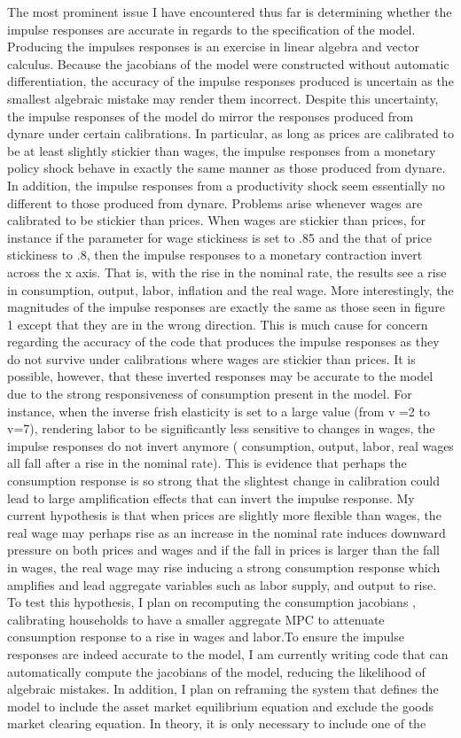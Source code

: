 \documentclass[titlepage]{\econtex}\providecommand{\texname}{FBS-NK}
\begin{document}
The most prominent issue I have encountered thus far is determining whether the impulse responses are accurate in regards to the specification of the model. Producing the impulses responses is an exercise in linear algebra and vector calculus. Because the jacobians of the model were constructed without automatic differentiation, the accuracy of the impulse responses produced is uncertain as the smallest algebraic mistake may render them incorrect. Despite this uncertainty, the impulse responses of the model do mirror the responses produced from dynare under certain calibrations.  In particular, as long as prices are calibrated to be at least slightly stickier than wages, the impulse responses from a monetary policy shock behave in exactly the same manner as those produced from dynare. In addition, the impulse responses from a productivity shock seem essentially no different to those produced from dynare. Problems arise whenever wages are calibrated to be stickier than prices. When wages are stickier than prices,  for instance if the parameter for wage stickiness is set to .85 and the that of price stickiness to .8, then the impulse responses to a monetary contraction invert across the x axis. That is, with the rise in the nominal rate, the results see a rise in consumption, output, labor, inflation and the real wage. More interestingly, the magnitudes of the impulse responses are exactly the same as those seen in figure 1 except that they are in the wrong direction. This is much cause for concern regarding the accuracy of the code that produces the impulse responses as they do not survive under calibrations where wages are stickier than prices. It is possible, however, that these inverted responses may be accurate to the model due to the strong responsiveness of consumption present in the model. For instance, when the inverse frish elasticity is set to a large value (from v =2 to v=7), rendering labor to be significantly less sensitive to changes in wages, the impulse responses do not invert anymore ( consumption, output, labor, real wages all fall after a rise in the nominal rate). This is evidence that perhaps the consumption response is so strong that the slightest change in calibration could lead to large amplification effects that can invert the impulse response. My current hypothesis is that when prices are slightly more flexible than wages, the real wage may perhaps rise as  an increase in the nominal rate induces downward pressure on both prices and wages and if the fall in prices is larger than the fall in wages, the real wage may rise inducing a strong consumption response which amplifies and lead aggregate variables such as labor supply, and output to rise. To test this hypothesis, I plan on recomputing the consumption jacobians , calibrating households to have a smaller aggregate MPC to attenuate consumption response to a rise in wages and labor.To ensure the impulse responses are indeed accurate to the model, I am currently writing code that can automatically compute the jacobians of the model, reducing the likelihood of algebraic mistakes. In addition, I plan on reframing the system that defines the model to include the asset market equilibrium equation and exclude the goods market clearing equation. In theory, it is only necessary to include one of the 
\end{document}
